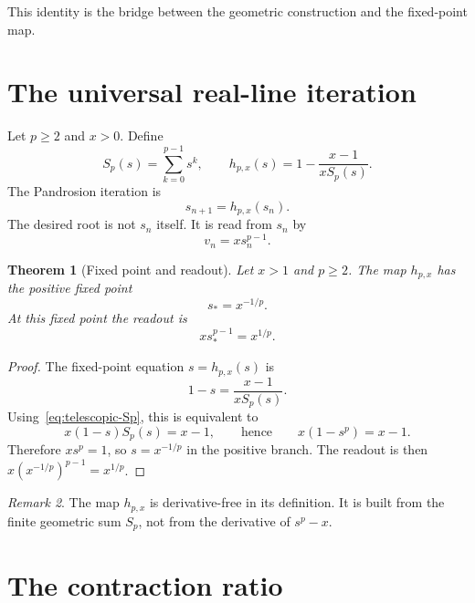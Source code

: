 \documentclass[10pt,a4paper]{article}
\theoremstyle{plain}
\newtheorem{theorem}{Theorem}[section]
\theoremstyle{definition}
\theoremstyle{remark}
\newtheorem{remark}[theorem]{Remark}
\newcommand{\Sp}{S_p}
\newcommand{\hp}{h_{p,x}}
\begin{document}
This identity is the bridge between the geometric construction and the
fixed-point map.

\section{The universal real-line iteration}
\label{sec:general}

Let $p\ge 2$ and $x>0$.  Define
\begin{equation}
  \Sp(s)=\sum_{k=0}^{p-1}s^k,
  \qquad
  \hp(s)=1-\frac{x-1}{x\Sp(s)}.
  \label{eq:hp-def}
\end{equation}
The Pandrosion iteration is
\begin{equation}
  s_{n+1}=\hp(s_n).
  \label{eq:pandrosion-iteration}
\end{equation}
The desired root is not $s_n$ itself.  It is read from $s_n$ by
\begin{equation}
  v_n=x s_n^{p-1}.
  \label{eq:readout}
\end{equation}

\begin{theorem}[Fixed point and readout]
\label{thm:fixed-point}
Let $x>1$ and $p\ge 2$.  The map $\hp$ has the positive fixed point
\[
  s_*=x^{-1/p}.
\]
At this fixed point the readout is
\[
  x s_*^{p-1}=x^{1/p}.
\]
\end{theorem}

\begin{proof}
The fixed-point equation $s=\hp(s)$ is
\[
  1-s=\frac{x-1}{x\Sp(s)}.
\]
Using~\eqref{eq:telescopic-Sp}, this is equivalent to
\[
  x(1-s)\Sp(s)=x-1,
  \qquad\text{hence}\qquad
  x(1-s^p)=x-1.
\]
Therefore $xs^p=1$, so $s=x^{-1/p}$ in the positive branch.  The readout is
then $x(x^{-1/p})^{p-1}=x^{1/p}$.
\end{proof}

\begin{remark}
The map $\hp$ is derivative-free in its definition.  It is built from the
finite geometric sum $\Sp$, not from the derivative of $s^p-x$.
\end{remark}

\section{The contraction ratio}
\label{sec:lambda}
\end{document}
